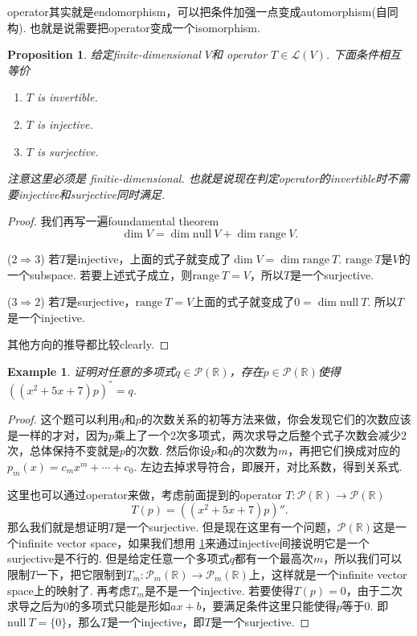 \documentclass{article}
\newtheorem{proposition}[theorem]{Proposition}
\newtheorem{example}[theorem]{Example}
\newcommand*{\xfunc}[4]{{#2}\colon{#3}{#1}{#4}}
\newcommand*{\func}[3]{\xfunc{\to}{#1}{#2}{#3}}
\newcommand\nul[1]{\text{null}\ #1}
\newcommand\range[1]{\text{range}\ #1}
\begin{document}
{\color{blue} operator其实就是endomorphism，可以把条件加强一点变成automorphism(自同构). 也就是说需要把operator变成一个isomorphism}.

\begin{proposition}\label{operator: iso-cond}
\rm 给定finite-dimensional $V$和 operator $T \in \mathcal{L}(V)$. 下面条件相互等价
\begin{enumerate}
	\item $T$ is invertible.
	\item $T$ is injective.
	\item $T$ is surjective.
\end{enumerate}
注意这里必须是{\color{red} finitie-dimensional}. {\color{blue}也就是说现在判定operator的invertible时不需要injective和surjective同时满足}.
\end{proposition}

\begin{proof}
我们再写一遍foundamental theorem
$$
\dim V  = \dim \nul{V}  + \dim \range{V}.
$$

($2 \Rightarrow 3$) 若$T$是injective，上面的式子就变成了$\dim V = \dim \range{T}$. $\range{T}$是$V$的一个subspace. 若要上述式子成立，则$\range{T} = V$，所以$T$是一个surjective.

($3 \Rightarrow 2$) 若$T$是surjective，$\range{T} = V$上面的式子就变成了$0 = \dim\nul{T}$. 所以$T$是一个injective. 

其他方向的推导都比较clearly.
\end{proof}

\begin{example}
证明对任意的多项式$q \in \mathcal{P}(\mathbb{R})$，存在$p \in \mathcal{P}(\mathbb{R})$使得$((x^2+5x+7)p)^{''}=q$.
\end{example}

\begin{proof}
这个题可以利用$q$和$p$的次数关系的初等方法来做，你会发现它们的次数应该是一样的才对，因为$p$乘上了一个2次多项式，两次求导之后整个式子次数会减少2次，总体保持不变就是$p$的次数. 然后你设$p$和$q$的次数为$m$，再把它们换成对应的$p_m(x)=c_mx^m+\cdots+c_0$. 左边去掉求导符合，即展开，对比系数，得到关系式.

这里也可以通过operator来做，考虑前面提到的operator $\func{T}{\mathcal{P}(\mathbb{R})}{\mathcal{P}(\mathbb{R})}$
$$
T(p) = ((x^2+5x+7)p)''.
$$
那么我们就是想证明$T$是一个surjective. 但是现在这里有一个问题，$\mathcal{P}(\mathbb{R})$这是一个infinite vector space，如果我们想用
\ref{operator: iso-cond}来通过injective间接说明它是一个surjective是不行的. 但是给定任意一个多项式$q$都有一个最高次$m$，所以我们可以限制$T$一下，把它限制到$\func{T_m}{\mathcal{P}_m(\mathbb{R})}{\mathcal{P}_m(\mathbb{R})}$上，这样就是一个infinite vector space上的映射了. 再考虑$T_m$是不是一个injective. 若要使得$T(p) = 0$，由于二次求导之后为0的多项式只能是形如$ax+b$，要满足条件这里只能使得$p$等于$0$. 即$\nul{T} = \{0\}$，那么$T$是一个injective，即$T$是一个surjective.
\end{proof}
\end{document}
